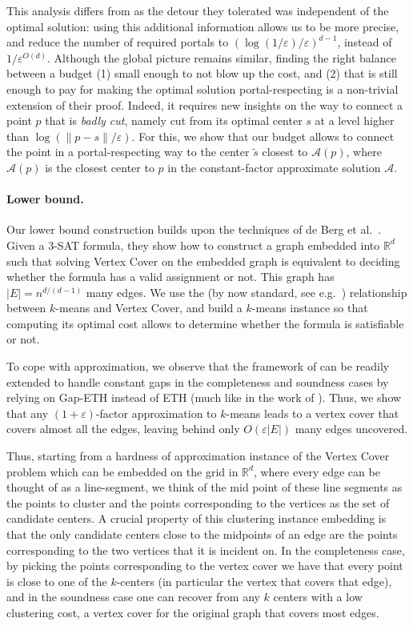 \documentclass[11pt]{article}
\newcommand{\R}{\mathbb R}
\newcommand{\eps}{\varepsilon}
\renewcommand{\tilde}{\widetilde}
\newcommand{\calL}{\mathcal{A}}
\newcommand{\lpar}{\left(}
\newcommand{\rpar}{\right)}
\begin{document}
This analysis differs from \cite{jacm} as the detour they tolerated  was independent of the optimal solution: using this additional information allows us to be more precise, and reduce the number of required portals to $(\log(1/\eps)/\eps)^{d-1}$, instead of $1/\eps^{O(d)}$. 
Although the global picture remains similar, finding the right balance between a budget (1) small enough to not blow up the cost, and (2) that is still enough to pay for making the optimal solution portal-respecting is a non-trivial extension of their proof. 
Indeed, it requires new insights on the way to connect a point $p$ that is \emph{badly cut}, namely cut from its optimal center $s$ at a level higher than $\log\lpar \|p-s\|/\eps\rpar$.
For this, we show that our budget allows to connect the point in a portal-respecting way to the center $\tilde s$ closest to $\calL(p)$, where $\calL(p)$ is the closest center to $p$ in the constant-factor approximate solution $\calL$.

\paragraph*{Lower bound.}
Our lower bound construction builds upon the techniques of de Berg et al.~\cite{de2018framework}. Given a 3-SAT formula, they show how to construct a graph embedded into $\R^d$ such that solving Vertex Cover on the embedded graph is equivalent to deciding whether the formula has a valid assignment or not. This graph has $|E| = n^{d/(d-1)}$ many edges. We use the (by now standard, see e.g.~\cite{CohenaddadSODA18}) relationship between $k$-means and Vertex Cover, and build a $k$-means instance so that computing its optimal cost allows to determine whether the formula is satisfiable or not. 

To cope with approximation, we observe that the framework of \cite{de2018framework} can be readily extended to handle constant gaps in the completeness and soundness cases by relying on Gap-ETH \cite{D16,MR16} instead of ETH (much like in the work of \cite{Kisfaludi-BakNW21}). Thus, we show that any $(1+\eps)$-factor approximation to $k$-means leads to a vertex cover that covers almost all the edges, leaving behind only $O(\eps |E|)$ many edges uncovered.

Thus, starting from a hardness of approximation instance    of the Vertex Cover problem which can be embedded on the grid in $\mathbb{R}^d$, where every edge can be thought of as a line-segment, we think of the mid point of these line segments as the points to cluster and the points corresponding to the vertices as the set of candidate centers. A crucial property of this clustering instance embedding is that the only candidate centers close to the midpoints of an edge are the points corresponding to the two vertices that it is incident on. In the completeness case, by picking the points corresponding to the vertex cover we have that every point is close to one of the $k$-centers (in particular the vertex that covers that edge), and in the soundness case one can recover from any $k$ centers with a low clustering cost, a vertex cover for the original graph that covers most edges. 
\end{document}

